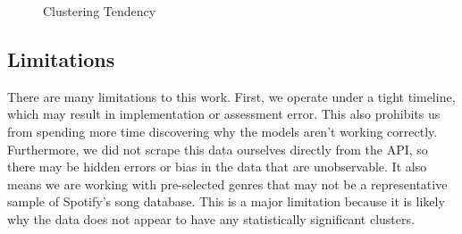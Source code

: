 \documentclass[conference]{IEEEtran}
\begin{document}
\begin{figure}[!ht]
    \begin{center}
    \end{center}
    \caption{Clustering Tendency}
    \label{fig:clustering-tendency}
\end{figure}



\subsection{Limitations}
There are many limitations to this work. First, we operate under a tight timeline, which may result in implementation or assessment error. This also prohibits us from spending more time discovering why the models aren't working correctly. Furthermore, we did not scrape this data ourselves directly from the API, so there may be hidden errors or bias in the data that are unobservable. It also means we are working with pre-selected genres that may not be a representative sample of Spotify's song database. This is a major limitation because it is likely why the data does not appear to have any statistically significant clusters. 
\end{document}
